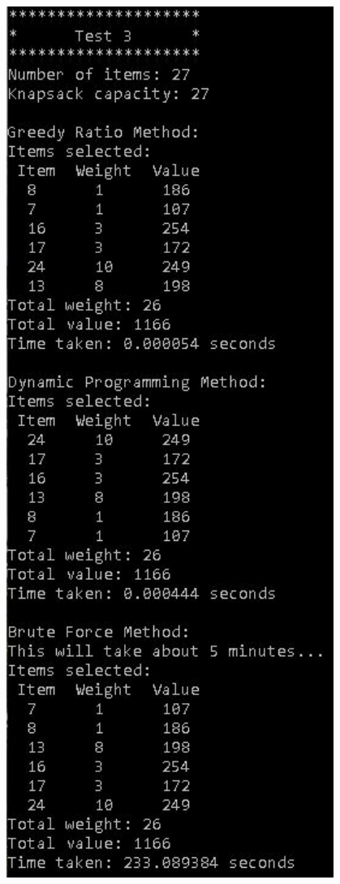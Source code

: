 \documentclass{article}
\begin{document}
\begin{figure}[H]
    \centering
    \begin{minipage}{0.49\textwidth}
        \centering
        \includegraphics[width=0.95\textwidth]{test3.JPG}

\end{minipage}
\end{figure}
\end{document}
